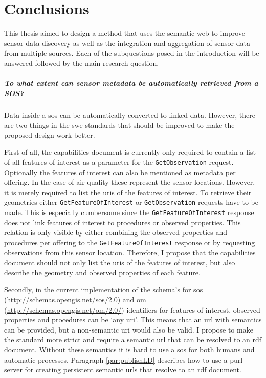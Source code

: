 
\chapter{Conclusions}
\label{chap:conclusion}

This thesis aimed to design a method that uses the semantic web to improve sensor data discovery as well as the integration and aggregation of sensor data from multiple sources. Each of the subquestions posed in the introduction will be answered followed by the main research question.

\paragraph{To what extent can sensor metadata be automatically retrieved from a SOS?}\mbox{}

Data inside a \acl{sos} can be automatically converted to linked data. However, there are two things in the \ac{swe} standards that should be improved to make the proposed design work better. 

First of all, the capabilities document is currently only required to contain a list of all features of interest as a parameter for the \texttt{GetObservation} request. Optionally the features of interest can also be mentioned as metadata per offering. In the case of air quality these represent the sensor locations. However, it is merely required to list the \acp{uri} of the features of interest. To retrieve their geometries either \texttt{GetFeatureOfInterest} or \texttt{GetObservation} requests have to be made. This is especially cumbersome since the \texttt{GetFeatureOfInterest} response does not link features of interest to procedures or observed properties. This relation is only visible by either combining the observed properties and procedures per offering to the \texttt{GetFeatureOfInterest} response or by requesting observations from this sensor location. Therefore, I propose that the capabilities document should not only list the \acp{uri} of the features of interest, but also describe the geometry and observed properties of each feature. 

Secondly, in the current implementation of the schema's for \ac{sos} (\url{http://schemas.opengis.net/sos/2.0}) and \ac{om} (\url{http://schemas.opengis.net/om/2.0/}) identifiers for features of interest, observed properties and procedures can be `any \ac{uri}'. This means that an \ac{url} with semantics can be provided, but a non-semantic \ac{uri} would also be valid. I propose to make the standard more strict and require a semantic \ac{url} that can be resolved to an \ac{rdf} document. Without these semantics it is hard to use a \ac{sos} for both humans and automatic processes. Paragraph \ref{par:publishLD} describes how to use a \ac{purl} server for creating persistent semantic \acp{url} that resolve to an \ac{rdf} document. 

